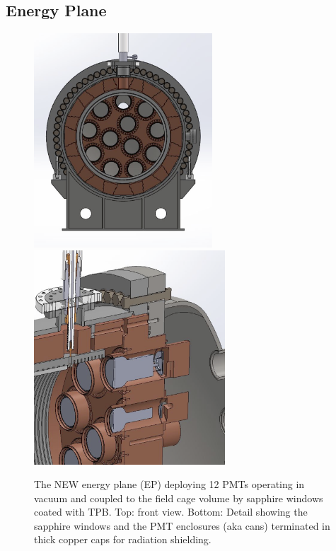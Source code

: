 \subsection{Energy Plane}
\begin{figure}[hpt!]
\centering
\includegraphics[height=8cm]{img2/NEPFrontView.png}
\includegraphics[height=8cm]{img2/NEPDetail.png}
\caption{The NEW energy plane (EP) deploying 12 PMTs operating in vacuum
and coupled to the field cage volume by sapphire windows coated with TPB. Top: front view. Bottom: Detail showing the sapphire windows and the PMT enclosures (aka cans) terminated in thick copper caps for radiation shielding.} \label{fig:NEP}
\end{figure}



